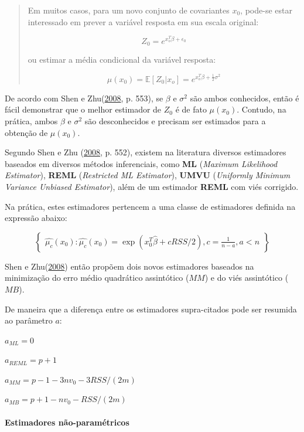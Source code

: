 \documentclass[a4paper, 12pt]{article}
\let\oldparagraph\paragraph
\renewcommand{\paragraph}[1]{\oldparagraph{#1}\mbox{}}
\begin{document}
\begin{quote}
Em muitos casos, para um novo conjunto de covariantes \(x_0\), pode-se
estar interessado em prever a variável resposta em sua escala original:

\[Z_0 = e^{x_o^T\beta + \epsilon_0}\]

ou estimar a média condicional da variável resposta:

\[\mu(x_0)=\mathbb{E}[Z_0|x_o] = e^{x_o^T\beta + \frac{1}{2}\sigma^2}\]
\end{quote}

De acordo com Shen e Zhu(\protect\hyperlink{ref-shen}{2008}, p. 553), se
\(\beta\) e \(\sigma^2\) são ambos conhecidos, então é fácil demonstrar
que o melhor estimador de \(Z_0\) é de fato \(\mu(x_0)\). Contudo, na
prática, ambos \(\beta\) e \(\sigma^2\) são desconhecidos e precisam ser
estimados para a obtenção de \(\mu(x_0)\).

Segundo Shen e Zhu (\protect\hyperlink{ref-shen}{2008}, p. 552), existem
na literatura diversos estimadores baseados em diversos métodos
inferenciais, como \textbf{ML} (\emph{Maximum Likelihood Estimator}),
\textbf{REML} (\emph{Restricted ML Estimator}), \textbf{UMVU}
(\emph{Uniformly Minimum Variance Unbiased Estimator}), além de um
estimador \textbf{REML} com viés corrigido.

Na prática, estes estimadores pertencem a uma classe de estimadores
definida na expressão abaixo:

\[\begin{Bmatrix}
\hat{\mu_c}(x_0):\hat{\mu_c}(x_0) = \exp(x_0^T\hat{\beta} + cRSS/2), c = \frac{1}{n-a}, a<n
\end{Bmatrix}\]

Shen e Zhu(\protect\hyperlink{ref-shen}{2008}) então propõem dois novos
estimadores baseados na minimização do erro médio quadrático assintótico
(\(MM\)) e do viés assintótico (\(MB\)).

De maneira que a diferença entre os estimadores supra-citados pode ser
resumida ao parâmetro \(a\):

\(a_{ML} = 0\)

\(a_{REML} = p + 1\)

\(a_{MM} = p - 1 - 3nv_0 - 3RSS/(2m)\)

\(a_{MB} = p + 1 - nv_0 - RSS/(2m)\)

\paragraph{Estimadores
não-paramétricos}\label{estimadores-nao-parametricos}
\end{document}
